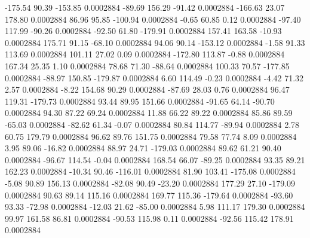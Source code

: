      -175.54       90.39     -153.85     0.0002884
      -89.69      156.29      -91.42     0.0002884
     -166.63       23.07      178.80     0.0002884
       86.96       95.85     -100.94     0.0002884
       -0.65       60.85        0.12     0.0002884
      -97.40      117.99      -90.26     0.0002884
      -92.50       61.80     -179.91     0.0002884
      157.41      163.58      -10.93     0.0002884
      175.71       91.15      -68.10     0.0002884
       94.06       90.14     -153.12     0.0002884
       -1.58       91.33      113.69     0.0002884
      101.11       27.02        0.09     0.0002884
     -172.80      113.87       -0.88     0.0002884
      167.34       25.35        1.10     0.0002884
       78.68       71.30      -88.64     0.0002884
      100.33       70.57     -177.85     0.0002884
      -88.97      150.85     -179.87     0.0002884
        6.60      114.49       -0.23     0.0002884
       -4.42       71.32        2.57     0.0002884
       -8.22      154.68       90.29     0.0002884
      -87.69       28.03        0.76     0.0002884
       96.47      119.31     -179.73     0.0002884
       93.44       89.95      151.66     0.0002884
      -91.65       64.14      -90.70     0.0002884
       94.30       87.22       69.24     0.0002884
       11.88       66.22       89.22     0.0002884
       85.86       89.59      -65.03     0.0002884
      -82.62       61.34       -0.07     0.0002884
       80.84      114.77      -89.94     0.0002884
        2.78       60.75      179.79     0.0002884
       96.62       89.76      151.75     0.0002884
       79.58       77.74        8.09     0.0002884
        3.95       89.06      -16.82     0.0002884
       88.97       24.71     -179.03     0.0002884
       89.62       61.21       90.40     0.0002884
      -96.67      114.54       -0.04     0.0002884
      168.54       66.07      -89.25     0.0002884
       93.35       89.21      162.23     0.0002884
      -10.34       90.46     -116.01     0.0002884
       81.90      103.41     -175.08     0.0002884
       -5.08       90.89      156.13     0.0002884
      -82.08       90.49      -23.20     0.0002884
      177.29       27.10     -179.09     0.0002884
       90.63       89.14      115.16     0.0002884
      169.77      115.36     -179.64     0.0002884
      -93.60       93.33      -72.98     0.0002884
      -12.03       21.62      -85.00     0.0002884
        5.98      111.17      179.30     0.0002884
       99.97      161.58       86.81     0.0002884
      -90.53      115.98        0.11     0.0002884
      -92.56      115.42      178.91     0.0002884
